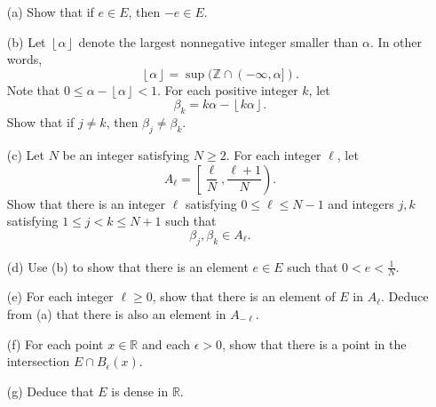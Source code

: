 \documentclass[12pt]{article}
\newcommand{\floor}[1]{\left\lfloor#1\right\rfloor}
\begin{document}
\begin{enumerate}
\item[(a)] Show that if $e \in E$, then $-e \in E$. 
\item[(b)] Let $\floor{\alpha}$ denote the largest nonnegative integer smaller than $\alpha$. In other words, 
\[
\floor{\alpha} = \sup(\mathbb{Z} \cap (-\infty, \alpha]).
\]
Note that $0 \leqslant \alpha - \floor{\alpha} < 1$. For each positive integer $k$, let 
\[
\beta_k = k\alpha - \floor{k\alpha}. 
\]
Show that if $j \ne k$, then $\beta_j \ne \beta_k$. 
\item[(c)] Let $N$ be an integer satisfying $N \geqslant 2$. For each integer $\ell$, let 
\[
A_\ell = \left[\frac{\ell}{N}, \frac{\ell + 1}{N}\right).
\]
Show that there is an integer $\ell$ satisfying $0 \leqslant \ell \leqslant N-1$ and integers $j,k$ satisfying $1 \leqslant j < k \leqslant N+1$ such that 
\[
\beta_j, \beta_k \in A_\ell.
\]
\item[(d)] Use (b) to show that there is an element $e \in E$ such that $0 < e < \frac{1}{N}$. 
\item[(e)] For each integer $\ell \geqslant 0$, show that there is an element of $E$ in $A_\ell$.  Deduce from (a) that there is also an element in $A_{-\ell}$.  
\item[(f)] For each point $x \in \mathbb{R}$ and each $\epsilon > 0$, show that there is a point in the intersection $E \cap B_\epsilon(x)$. 
\item[(g)] Deduce that $E$ is dense in $\mathbb{R}$. 
\end{enumerate}
\end{document}
